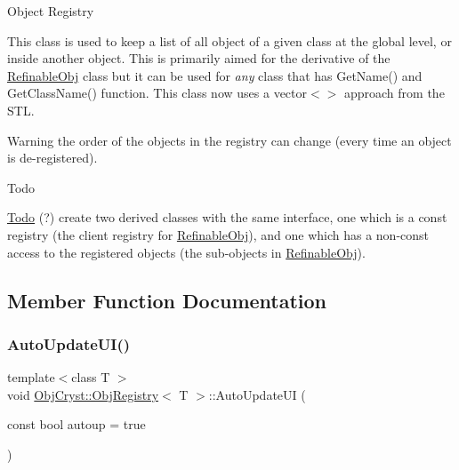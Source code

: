 Object Registry

This class is used to keep a list of all object of a given class at the global level, or inside another object. This is primarily aimed for the derivative of the \mbox{\hyperlink{class_obj_cryst_1_1_refinable_obj}{Refinable\+Obj}} class but it can be used for {\itshape any} class that has Get\+Name() and Get\+Class\+Name() function. This class now uses a vector$<$$>$ approach from the S\+TL.

\begin{DoxyWarning}{Warning}
the order of the objects in the registry can change (every time an object is de-\/registered).
\end{DoxyWarning}
\begin{DoxyRefDesc}{Todo}
\item[\mbox{\hyperlink{todo__todo000002}{Todo}}](?) create two derived classes with the same interface, one which is a const registry (the \textquotesingle{}client\textquotesingle{} registry for \mbox{\hyperlink{class_obj_cryst_1_1_refinable_obj}{Refinable\+Obj}}), and one which has a non-\/const access to the registered objects (the \textquotesingle{}sub-\/objects\textquotesingle{} in \mbox{\hyperlink{class_obj_cryst_1_1_refinable_obj}{Refinable\+Obj}}). \end{DoxyRefDesc}


\subsection{Member Function Documentation}
\mbox{\label{class_obj_cryst_1_1_obj_registry_a161b9a23fa38db7748a2202cc691b81c}} 
\subsubsection{\texorpdfstring{AutoUpdateUI()}{AutoUpdateUI()}}
{\footnotesize\ttfamily template$<$class T $>$ \\
void \mbox{\hyperlink{class_obj_cryst_1_1_obj_registry}{Obj\+Cryst\+::\+Obj\+Registry}}$<$ T $>$\+::Auto\+Update\+UI (\begin{DoxyParamCaption}\item[{const bool}]{autoup = {\ttfamily true} }\end{DoxyParamCaption})}

